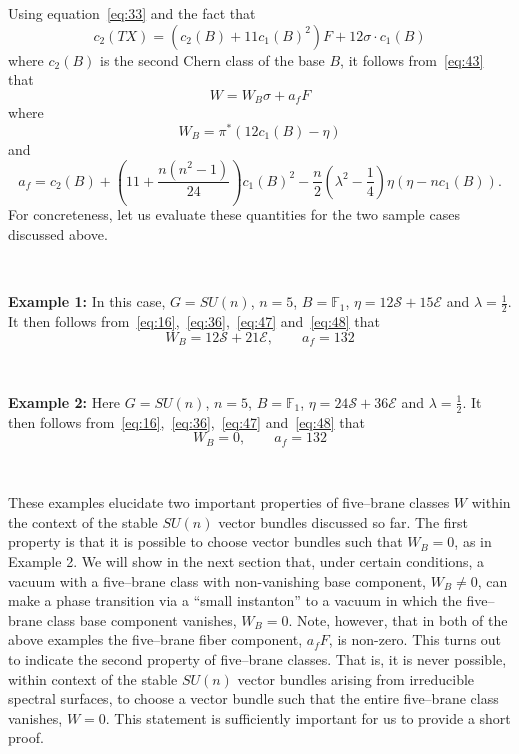 \documentclass[a4paper,12pt]{article}
\numberwithin{equation}{section}
\def\cE{{\mathcal E}}
\def\cS{{\mathcal S}}
\theoremstyle{plain}
\begin{document}
Using equation~\eqref{eq:33} and the fact that
\begin{equation}
c_{2}(TX)=(c_{2}(B)+11c_{1}(B)^{2})F +12\sigma\cdot c_{1}(B)
\label{eq:45}
\end{equation}
where $c_{2}(B)$ is the second Chern class of the base $B$, 
it follows from~\eqref{eq:43} that
\begin{equation}
W=W_{B}\sigma +a_{f}F
\label{eq:46}
\end{equation}
where
\begin{equation}
W_{B}=\pi^{*}(12c_{1}(B)-\eta)
\label{eq:47}
\end{equation}
and
\begin{equation}
a_{f}=c_{2}(B)+(11+\frac{n(n^{2}-1)}{24})c_{1}(B)^{2}-\frac{n}{2}
(\lambda^{2}-\frac{1}{4})\eta(\eta-nc_{1}(B)).
\label{eq:48}
\end{equation}
For concreteness, let us evaluate these quantities for the two sample cases
discussed above.

\smallskip

\

\noindent
{\bf Example 1:} \quad In this case, $G=SU(n)$, $n=5$, $B={\mathbb F}_{1}$, 
$\eta=12\cS+15\cE$ and
$\lambda=\frac{1}{2}$. It then follows
from~\eqref{eq:16},~\eqref{eq:36},~\eqref{eq:47} and~\eqref{eq:48} that 
\begin{equation}
W_{B}=12\cS+21\cE, \qquad a_{f}=132
\label{eq:49}
\end{equation}


\smallskip

\

\noindent
{\bf Example 2:} \quad Here $G=SU(n)$, $n=5$, $B={\mathbb F}_{1}$, 
$\eta=24\cS+36\cE$ and
$\lambda=\frac{1}{2}$. It then follows
from~\eqref{eq:16},~\eqref{eq:36},~\eqref{eq:47} and~\eqref{eq:48} that 
\begin{equation}
W_{B}=0, \qquad a_{f}=132
\label{eq:50}
\end{equation}

\smallskip

\

These examples elucidate two important properties of five--brane classes
$W$ within the context of the stable $SU(n)$ vector bundles discussed so
far. The first property is that it is possible to choose vector bundles such
that $W_{B}=0$, as in Example 2. We will show in the next section that, 
under certain conditions, a vacuum with a five--brane 
class with non-vanishing base component, $W_{B} \neq 0$, can make a phase
transition via a ``small instanton'' to a vacuum in which the five--brane 
class base component vanishes, $W_{B}=0$. Note, however, that 
in both of the above examples the five--brane
fiber component, $a_{f}F$, is non-zero. This turns out to indicate the second
property of five--brane classes. That is, it is never possible, 
within context of the stable $SU(n)$ vector bundles arising from 
irreducible spectral surfaces,  
to choose a vector bundle such that the entire five--brane class vanishes,
$W=0$. This statement is sufficiently important for us to provide a short
proof.
\end{document}
